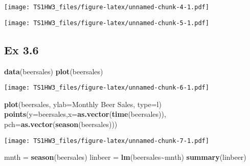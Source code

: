 \documentclass[
]{article}
\newenvironment{Shaded}{\begin{snugshade}}{\end{snugshade}}
\newcommand{\AttributeTok}[1]{\textcolor[rgb]{0.13,0.29,0.53}{#1}}
\newcommand{\FunctionTok}[1]{\textcolor[rgb]{0.13,0.29,0.53}{\textbf{#1}}}
\newcommand{\NormalTok}[1]{#1}
\newcommand{\OtherTok}[1]{\textcolor[rgb]{0.56,0.35,0.01}{#1}}
\newcommand{\SpecialCharTok}[1]{\textcolor[rgb]{0.81,0.36,0.00}{\textbf{#1}}}
\newcommand{\StringTok}[1]{\textcolor[rgb]{0.31,0.60,0.02}{#1}}
\begin{document}
\texttt{[image: TS1HW3\_files/figure-latex/unnamed-chunk-4-1.pdf]}

\begin{Shaded}
\end{Shaded}

\texttt{[image: TS1HW3\_files/figure-latex/unnamed-chunk-5-1.pdf]}

\hypertarget{ex-3.6}{%
\subsection{Ex 3.6}\label{ex-3.6}}

\begin{Shaded}
\begin{Highlighting}[]
\FunctionTok{data}\NormalTok{(beersales)}
\FunctionTok{plot}\NormalTok{(beersales)}
\end{Highlighting}
\end{Shaded}

\texttt{[image: TS1HW3\_files/figure-latex/unnamed-chunk-6-1.pdf]}

\begin{Shaded}
\begin{Highlighting}[]
\FunctionTok{plot}\NormalTok{(beersales, }\AttributeTok{ylab=}\StringTok{\textquotesingle{}Monthly Beer Sales\textquotesingle{}}\NormalTok{, }\AttributeTok{type=}\StringTok{\textquotesingle{}l\textquotesingle{}}\NormalTok{)}
\FunctionTok{points}\NormalTok{(}\AttributeTok{y=}\NormalTok{beersales,}\AttributeTok{x=}\FunctionTok{as.vector}\NormalTok{(}\FunctionTok{time}\NormalTok{(beersales)), }\AttributeTok{pch=}\FunctionTok{as.vector}\NormalTok{(}\FunctionTok{season}\NormalTok{(beersales)))}
\end{Highlighting}
\end{Shaded}

\texttt{[image: TS1HW3\_files/figure-latex/unnamed-chunk-7-1.pdf]}

\begin{Shaded}
\begin{Highlighting}[]
\NormalTok{mnth }\OtherTok{=} \FunctionTok{season}\NormalTok{(beersales)}
\NormalTok{linbeer }\OtherTok{=} \FunctionTok{lm}\NormalTok{(beersales}\SpecialCharTok{\textasciitilde{}}\NormalTok{mnth)}
\FunctionTok{summary}\NormalTok{(linbeer)}
\end{Highlighting}
\end{Shaded}
\end{document}
